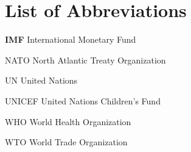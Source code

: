 \chapter*{List of Abbreviations}

\begin{abbrv}

\item[\textbf{IMF}] International Monetary Fund

\item[NATO] North Atlantic Treaty Organization

\item[UN] United Nations

\item[UNICEF] United Nations Children's Fund

\item[WHO] World Health Organization

\item[WTO] World Trade Organization

\end{abbrv} 
